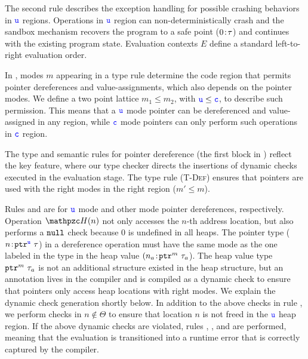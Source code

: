 The second rule describes the exception handling 
for possible crashing behaviors in $\umode$ regions.
Operations in $\umode$ region can non-deterministically crash
and the \lang sandbox mechanism recovers
the program to a safe point ($\evalue{0}{\tau}$)
and continues with the existing program state.
Evaluation contexts $E$ define a standard left-to-right evaluation order. 

In \lang, modes $m$ appearing in a type rule determine the code region 
that permits pointer dereferences and value-assignments, which also depends on the pointer modes.
We define a two point lattice $m_1 \le m_2$, with $\umode \le \cmode$, to describe such permission.
This means that a $\umode$ mode pointer can be dereferenced and value-assigned in any region, while $\cmode$ mode pointers can only perform such operations in $\cmode$ region.

The type and semantic rules for pointer dereference (the first block in )
reflect the key \lang feature, where our type checker directs the insertions of dynamic checks executed in the evaluation stage.
The type rule (\textsc{T-Def}) ensures that pointers are used with the right modes in the right region ($m' \le m$).

Rules  and  are for $\umode$ mode and other mode pointer dereferences, respectively.
Operation $\heap(n)$ not only accesses the $n$-th address location,
but also performs a $\enull$ check because $0$ is undefined in all heaps.
The pointer type ($\evalue{n}{\tptr{\tau}{\umode}}$) in a dereference operation must have the same mode
as the one labeled in the type in the heap value $(\evalue{n_a}{\tptr{\tau_a}{m}}$).
The heap value type $\tptr{\tau_a}{m}$ is not an additional structure existed in the heap structure,
but an annotation lives in the compiler and is compiled as a dynamic check to ensure that pointers only access heap locations with right modes. We explain the dynamic check generation shortly below.
In addition to the above checks in rule ,
we perform checks in  $n \not\in \Theta$ to ensure that location $n$ is not freed in the $\umode$ heap region.
If the above dynamic checks are violated, rules , , and  are performed, meaning that the evaluation is transitioned into a runtime error that is correctly captured by the \systemname compiler.

